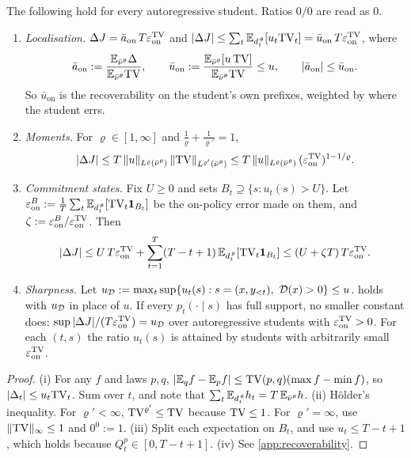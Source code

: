 \begin{theorem}\label{thm:local-u}
\Pv\Ck The following hold for every autoregressive student. Ratios $0/0$ are read as $0$.
\begin{enumerate}[label=(\roman*),nosep]
\item \emph{Localisation.} $\Delta J=\bar a_{\mathrm{on}}\,T\varepsilon_{\mathrm{on}}^{\mathrm{TV}}$ and
$|\Delta J|\le\sum_t\mathbb{E}_{d^{\,\theta}_{t}}[u_t\mathrm{TV}_t]=\bar u_{\mathrm{on}}\,T\varepsilon_{\mathrm{on}}^{\mathrm{TV}}$, where
\[
\bar a_{\mathrm{on}}:=\frac{\mathbb{E}_{\bar\nu^\theta}\Delta}{\mathbb{E}_{\bar\nu^\theta}\mathrm{TV}},\qquad
\bar u_{\mathrm{on}}:=\frac{\mathbb{E}_{\bar\nu^\theta}[u\,\mathrm{TV}]}{\mathbb{E}_{\bar\nu^\theta}\mathrm{TV}}\le u,\qquad
|\bar a_{\mathrm{on}}|\le\bar u_{\mathrm{on}}.
\]
So $\bar u_{\mathrm{on}}$ is the recoverability on the student's own prefixes, weighted by where the student errs.
\item \emph{Moments.} For $\varrho\in[1,\infty]$ and $\frac1\varrho+\frac1{\varrho'}=1$,
\[
|\Delta J|\le T\,\|u\|_{L^\varrho(\bar\nu^\theta)}\,\|\mathrm{TV}\|_{L^{\varrho'}(\bar\nu^\theta)}\le T\,\|u\|_{L^\varrho(\bar\nu^\theta)}\,(\varepsilon_{\mathrm{on}}^{\mathrm{TV}})^{1-1/\varrho}.
\]
\item \emph{Commitment states.} Fix $U\ge0$ and sets $B_t\supseteq\{s:u_t(s)>U\}$. Let
$\varepsilon^B_{\mathrm{on}}:=\frac1T\sum_t\mathbb{E}_{d^{\,\theta}_{t}}[\mathrm{TV}_t\mathbf{1}_{B_t}]$ be the on-policy error made on them, and
$\zeta:=\varepsilon^B_{\mathrm{on}}/\varepsilon_{\mathrm{on}}^{\mathrm{TV}}$. Then
\[
|\Delta J|\le U\,T\varepsilon_{\mathrm{on}}^{\mathrm{TV}}+\sum_{t=1}^T(T-t+1)\,\mathbb{E}_{d^{\,\theta}_{t}}[\mathrm{TV}_t\mathbf{1}_{B_t}]\le(U+\zeta T)\,T\varepsilon_{\mathrm{on}}^{\mathrm{TV}}.
\]
\item \emph{Sharpness.} Let $u_\cD:=\max_t\sup\{u_t(s):s=(x,y_{<t}),\ \cD(x)>0\}\le u$.  holds with $u_{\mathcal{D}}$ in
place of $u$. If every $p_t(\cdot\mid s)$ has full support, no smaller constant does:
$\sup|\Delta J|/(T\varepsilon_{\mathrm{on}}^{\mathrm{TV}})=u_{\mathcal{D}}$ over autoregressive students with $\varepsilon_{\mathrm{on}}^{\mathrm{TV}}>0$. For each $(t,s)$ the ratio $u_t(s)$ is
attained by students with arbitrarily small $\varepsilon_{\mathrm{on}}^{\mathrm{TV}}$.
\end{enumerate}
\end{theorem}
\begin{proof}
(i) For any $f$ and laws $p,q$, $|\mathbb{E}_qf-\mathbb{E}_pf|\le\mathrm{TV}(p,q)(\max f-\min f)$, so $|\Delta_t|\le u_t\mathrm{TV}_t$. Sum over $t$, and
note that $\sum_t\mathbb{E}_{d^{\,\theta}_{t}}h_t=T\,\mathbb{E}_{\bar\nu^\theta}h$.
(ii) Hölder's inequality. For $\varrho'<\infty$, $\mathrm{TV}^{\varrho'}\le\mathrm{TV}$ because $\mathrm{TV}\le1$. For $\varrho'=\infty$, use $\|\mathrm{TV}\|_\infty\le1$ and
$0^0:=1$.
(iii) Split each expectation on $B_t$, and use $u_t\le T-t+1$, which holds because $Q^p_t\in[0,T-t+1]$.
(iv) See \cref{app:recoverability}.
\end{proof}

